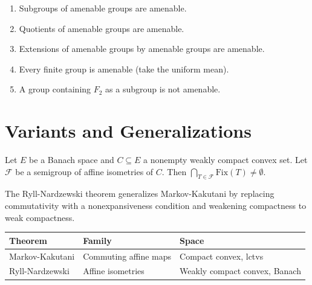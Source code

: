 \begin{proposition}
\begin{enumerate}
  \item Subgroups of amenable groups are amenable.
  \item Quotients of amenable groups are amenable.
  \item Extensions of amenable groups by amenable groups are amenable.
  \item Every finite group is amenable (take the uniform mean).
  \item A group containing $F_2$ as a subgroup is not amenable.
\end{enumerate}
\end{proposition}

\section{Variants and Generalizations}

\begin{theorem}
\label{thm:ryll-nardzewski}
Let $E$ be a Banach space and $C \subseteq E$ a nonempty weakly compact convex set. Let
$\mathcal{F}$ be a semigroup of affine isometries of $C$. Then
$\bigcap_{T \in \mathcal{F}} \mathrm{Fix}(T) \neq \emptyset$.
\end{theorem}

\begin{remark}
The Ryll-Nardzewski theorem generalizes Markov-Kakutani by replacing commutativity with a
nonexpansiveness condition and weakening compactness to weak compactness.
\end{remark}

\begin{keyformulas}[title=\textbf{Common fixed points}]
\begin{center}
\renewcommand{\arraystretch}{1.3}
\begin{tabular}{|l|l|l|}
\hline
\textbf{Theorem} & \textbf{Family} & \textbf{Space} \\
\hline
Markov-Kakutani & Commuting affine maps & Compact convex, lctvs \\
Ryll-Nardzewski & Affine isometries & Weakly compact convex, Banach \\
\hline
\end{tabular}
\end{center}
\end{keyformulas}

